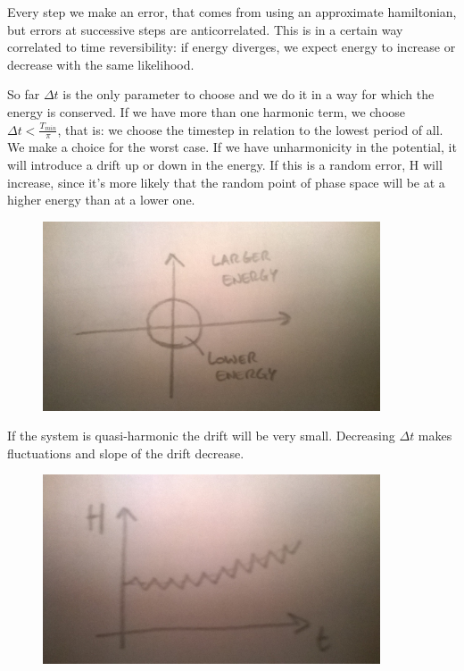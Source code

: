 \documentclass[a4paper, italian, openany]{book}
\begin{document}
Every step we make an error, that comes from using an approximate hamiltonian, but errors at successive steps are anticorrelated. This is in a certain way correlated to time reversibility: if energy diverges, we expect energy to increase or decrease with the same likelihood. 

So far $\Delta t$ is the only parameter to choose and we do it in a way for which the energy is conserved.\newline
If we have more than one harmonic term, we choose $\Delta t < \frac{T_{min}}{\pi}$, that is: we choose the timestep in relation to the lowest period of all. We make a choice for the worst case.\newline
If we have unharmonicity in the potential, it will introduce a drift up or down in the energy. If this is a random error, H will increase, since it's more likely that the random point of phase space will be at a higher energy than at a lower one.

\begin{figure}[H]
\centering
\includegraphics[width=100mm]{img/pic6.jpg}
\end{figure}

If the system is quasi-harmonic the drift will be very small. Decreasing $\Delta t$ makes fluctuations and slope of the drift decrease.

\begin{figure}[H]
\centering
\includegraphics[width=100mm]{img/pic7.jpg}
\end{figure}
\end{document}
